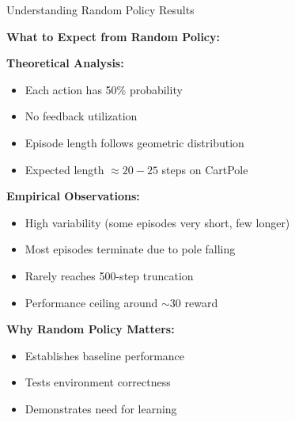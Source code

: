 \documentclass[aspectratio=169,10pt]{beamer}
\begin{document}
\begin{frame}{Understanding Random Policy Results}

\textbf{What to Expect from Random Policy:}

\vfill

\textbf{Theoretical Analysis:}
\begin{itemize}
    \item Each action has 50\% probability
    \item No feedback utilization  
    \item Episode length follows geometric distribution
    \item Expected length $\approx 20-25$ steps on CartPole
\end{itemize}

\vfill

\textbf{Empirical Observations:}
\begin{itemize}
    \item High variability (some episodes very short, few longer)
    \item Most episodes terminate due to pole falling
    \item Rarely reaches 500-step truncation
    \item Performance ceiling around $\sim 30$ reward
\end{itemize}

\vfill

\textbf{Why Random Policy Matters:}
\begin{itemize}
    \item Establishes baseline performance
    \item Tests environment correctness
    \item Demonstrates need for learning
\end{itemize}

\end{frame}
\end{document}
